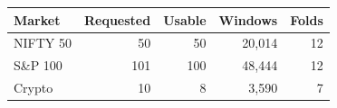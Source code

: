 \begin{tabular}{lrrrr}
\toprule
Market & Requested & Usable & Windows & Folds \\
\midrule
NIFTY 50 & 50 & 50 & 20,014 & 12 \\
S\&P 100 & 101 & 100 & 48,444 & 12 \\
Crypto & 10 & 8 & 3,590 & 7 \\
\bottomrule
\end{tabular}
